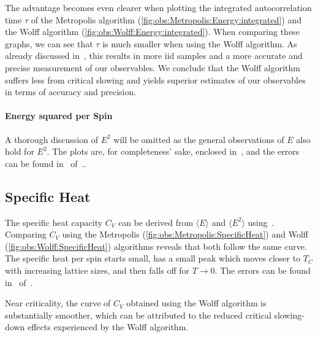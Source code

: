 		The advantage becomes even clearer when plotting the integrated autocorrelation time $\tau$ of the Metropolis algorithm (\cref{fig:obs:Metropolis:Energy:integrated}) and the Wolff algorithm (\cref{fig:obs:Wolff:Energy:integrated}). When comparing these graphs, we can see that $\tau$ is much smaller when using the Wolff algorithm. As already discussed in~, this results in more iid samples and a more accurate and precise measurement of our observables. We conclude that the Wolff algorithm suffers less from critical slowing and yields superior estimates of our observables in terms of accuracy and precision.
	
	\paragraph{Energy squared per Spin}\label{sec:res:energysquare} A thorough discussion of $E^2$ will be omitted as the general observations of $E$ also hold for $E^2$. The plots are, for completeness' sake, enclosed in~, and the errors can be found in~ of~..
	
	\subsection{Specific Heat}\label{sec:res:cv:observable}
		The specific heat capacity $C_V$ can be derived from $\langle E \rangle$ and $\langle E^2 \rangle$  using~. Comparing $C_V$ using the Metropolis (\cref{fig:obs:Metropolis:SpecificHeat}) and Wolff (\cref{fig:obs:Wolff:SpecificHeat}) algorithms reveals that both follow the same curve. The specific heat per spin starts small, has a small peak which moves closer to $T_C$ with increasing lattice sizes, and then falls off for $T\rightarrow 0$. The errors can be found in~ of~.
		
		Near criticality, the curve of $C_V$ obtained using the Wolff algorithm is substantially smoother, which can be attributed to the reduced critical slowing-down effects experienced by the Wolff algorithm.
	
